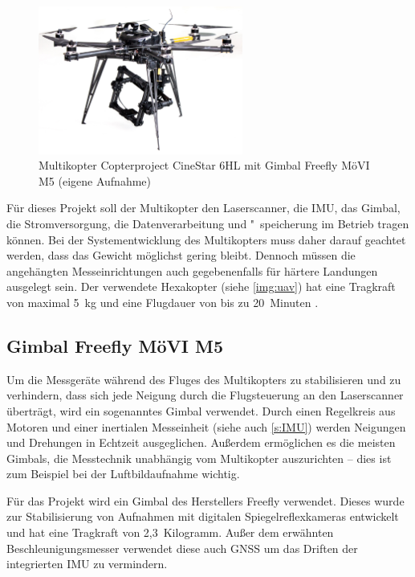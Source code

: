 \documentclass[a4paper,12pt,bibliography=totoc, listof=totoc,titlepage,pointlessnumbers]{scrreprt}
\begin{document}
\begin{figure}
 \centering
 \includegraphics[width=0.6\textwidth]{./img/uav.jpg}
 \caption{Multikopter Copterproject CineStar 6HL mit Gimbal Freefly MöVI M5 (eigene Aufnahme)}
 \label{img:uav}
\end{figure}

Für dieses Projekt soll der Multikopter den Laser\-scan\-ner, die IMU, das Gimbal, die Strom\-ver\-sor\-gung, die Datenverarbeitung und "~speicherung im Betrieb tragen können. Bei der Systementwicklung des Multikopters muss daher darauf geachtet werden, dass das Gewicht möglichst gering bleibt. Dennoch müssen die angehängten Messeinrichtungen auch gegebenenfalls für härtere Landungen ausgelegt sein. Der verwendete Hexakopter (siehe \autoref{img:uav}) hat eine Tragkraft von maximal 5~kg und eine Flugdauer von bis zu 20~Minuten \citep{Schulz}.

\subsection{Gimbal Freefly MöVI M5}
Um die Messgeräte während des Fluges des Multikopters zu stabilisieren und zu verhindern, dass sich jede Neigung durch die Flug\-steuerung an den Laser\-scan\-ner überträgt, wird ein sogenanntes Gimbal verwendet. Durch einen Regelkreis aus Motoren und einer inertialen Messeinheit (siehe auch \autoref{s:IMU}) werden Neigungen und Drehungen in Echtzeit ausgeglichen. Außerdem ermöglichen es die meisten Gimbals, die Messtechnik unabhängig vom Multikopter auszurichten -- dies ist zum Beispiel bei der Luftbildaufnahme wichtig.

Für das Projekt wird ein Gimbal des Herstellers Freefly verwendet. Dieses wurde zur Stabilisierung von Aufnahmen mit digitalen Spiegelreflexkameras entwickelt und hat eine Tragkraft von 2,3~Kilogramm. Außer dem erwähnten Beschleunigungsmesser verwendet diese auch GNSS um das Driften der integrierten IMU zu vermindern. \citep{movim5}
\end{document}
